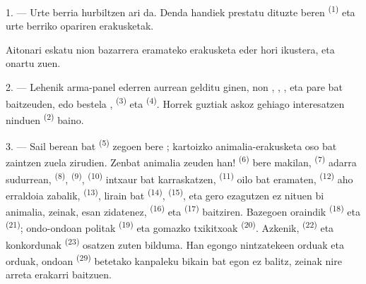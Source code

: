 %
%

\VUsaut{4.0mm}
\VUsaut{2.0mm}
\VUsaut{3.4mm}

1. --- Urte berria hurbiltzen ari da. Denda handiek prestatu dituzte beren
 \textsuperscript{(1)} eta urte berriko opariren erakusketak.

Aitonari eskatu nion bazarrera eramateko erakusketa eder hori ikustera, eta
onartu zuen.

2. --- Lehenik arma-panel ederren aurrean gelditu ginen, non
, , ,  eta
 pare bat baitzeuden, edo bestela ,
 \textsuperscript{(3)} eta 
\textsuperscript{(4)}. Horrek guztiak askoz gehiago interesatzen ninduen
 \textsuperscript{(2)} baino.

\VUsaut{3.0mm}
\VUsaut{2.6mm}

3. --- Sail berean  bat \textsuperscript{(5)} zegoen bere
; kartoizko animalia-erakusketa oso bat zaintzen zuela zirudien.
Zenbat animalia zeuden han!  \textsuperscript{(6)} bere makilan,
 \textsuperscript{(7)} adarra sudurrean, 
\textsuperscript{(8)},  \textsuperscript{(9)},
 \textsuperscript{(10)} intxaur bat karraskatzen,
 \textsuperscript{(11)} oilo bat eramaten, 
\textsuperscript{(12)} aho erraldoia zabalik, 
\textsuperscript{(13)},  lirain bat \textsuperscript{(14)},
 \textsuperscript{(15)}, eta gero ezagutzen ez nituen bi animalia,
zeinak, esan zidatenez,  \textsuperscript{(16)} eta
 \textsuperscript{(17)} baitziren. Bazegoen oraindik
 \textsuperscript{(18)} eta 
\textsuperscript{(21)}; ondo-ondoan  politak
\textsuperscript{(19)} eta gomazko  txikitxoak
\textsuperscript{(20)}. Azkenik,  \textsuperscript{(22)}
eta  konkordunak \textsuperscript{(23)} osatzen zuten bilduma.
Han egongo nintzatekeen orduak eta orduak, ondoan 
\textsuperscript{(29)} betetako kanpaleku bikain bat egon ez balitz, zeinak nire
arreta erakarri baitzuen.


